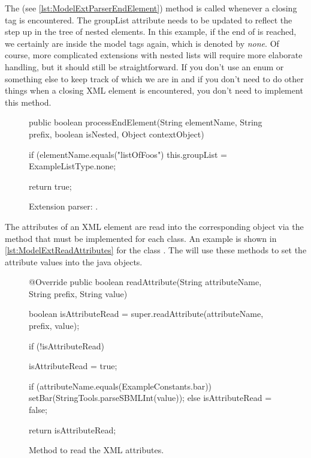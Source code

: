 The  (see \vref{lst:ModelExtParserEndElement}) 
method is called whenever a closing tag is
encountered.  The groupList attribute needs to be updated to reflect the step
up in the tree of nested elements.  In this example, if the end of
 is reached, we certainly are inside the model tags
again, which is denoted by \emph{none}.  Of course, more complicated
extensions with nested lists will require more elaborate handling, but it
should still be straightforward. If you don't use an enum or something else to
keep track of which  we are in and if you don't need to do other
things when a closing XML element is encountered, you don't need to implement this method.

\begin{figure}[htb]
  \begin{example}[numbers=left]
public boolean processEndElement(String elementName, String prefix,
  boolean isNested, Object contextObject) {

  if (elementName.equals("listOfFoos") {
    this.groupList = ExampleListType.none;
  }

  return true;
}\end{example}
  \caption{Extension parser: .}
  \label{lst:ModelExtParserEndElement}
\end{figure}

The attributes of an XML element are read into the corresponding object via the
 method that must be implemented for each class.  An
example is shown in \vref{lst:ModelExtReadAttributes} for the class
. The  will use these methods to set the 
attribute values into the java objects.

\begin{figure}[htb]
  \begin{example}[numbers=left]
@Override
public boolean readAttribute(String attributeName, String prefix, String value) {

  boolean isAttributeRead = super.readAttribute(attributeName, prefix, value);

  if (!isAttributeRead) {
    isAttributeRead = true;

    if (attributeName.equals(ExampleConstants.bar)) {
      setBar(StringTools.parseSBMLInt(value));
    } else {
      isAttributeRead = false;
    }
  }

  return isAttributeRead;
}\end{example}
  \caption{Method to read the XML attributes.}
  \label{lst:ModelExtReadAttributes}
\end{figure}



